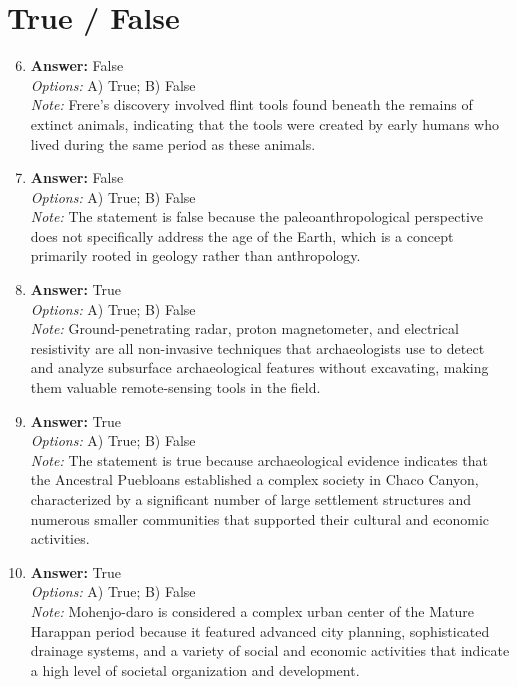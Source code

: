 \documentclass[12pt]{article}
\begin{document}
\section*{True / False}
\begin{enumerate}[label=\arabic*.]
\setcounter{enumi}{5}
\item \textbf{Answer:} False
\\ \textit{Options:} A) True; B) False
\\ \textit{Note:} Frere's discovery involved flint tools found beneath the remains of extinct animals, indicating that the tools were created by early humans who lived during the same period as these animals.
\item \textbf{Answer:} False
\\ \textit{Options:} A) True; B) False
\\ \textit{Note:} The statement is false because the paleoanthropological perspective does not specifically address the age of the Earth, which is a concept primarily rooted in geology rather than anthropology.
\item \textbf{Answer:} True
\\ \textit{Options:} A) True; B) False
\\ \textit{Note:} Ground-penetrating radar, proton magnetometer, and electrical resistivity are all non-invasive techniques that archaeologists use to detect and analyze subsurface archaeological features without excavating, making them valuable remote-sensing tools in the field.
\item \textbf{Answer:} True
\\ \textit{Options:} A) True; B) False
\\ \textit{Note:} The statement is true because archaeological evidence indicates that the Ancestral Puebloans established a complex society in Chaco Canyon, characterized by a significant number of large settlement structures and numerous smaller communities that supported their cultural and economic activities.
\item \textbf{Answer:} True
\\ \textit{Options:} A) True; B) False
\\ \textit{Note:} Mohenjo-daro is considered a complex urban center of the Mature Harappan period because it featured advanced city planning, sophisticated drainage systems, and a variety of social and economic activities that indicate a high level of societal organization and development.
\end{enumerate}
\end{document}
